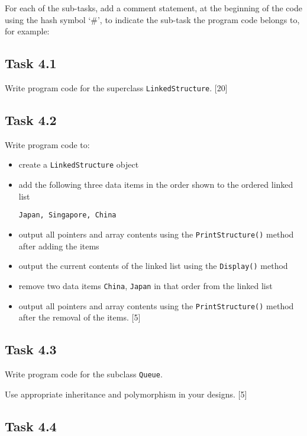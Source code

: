 For each of the sub-tasks, add a comment statement, at the beginning
of the code using the hash symbol \textquoteleft \#\textquoteright ,
to indicate the sub-task the program code belongs to, for example:

\subsection*{Task 4.1 }

Write program code for the superclass \texttt{LinkedStructure}. \hfill{}{[}20{]}

\subsection*{Task 4.2}

Write program code to:
\begin{itemize}
\item create a \texttt{LinkedStructure} object 
\item add the following three data items in the order shown to the ordered
linked list 
\noindent \begin{center}
\texttt{Japan, Singapore, China }
\par\end{center}
\item output all pointers and array contents using the \texttt{PrintStructure()}
method after adding the items 
\item output the current contents of the linked list using the \texttt{Display()}
method 
\item remove two data items \texttt{China}, \texttt{Japan} in that order
from the linked list 
\item output all pointers and array contents using the \texttt{PrintStructure()}
method after the removal of the items. \hfill{} {[}5{]}
\end{itemize}

\subsection*{Task 4.3}

Write program code for the subclass \texttt{Queue}.

Use appropriate inheritance and polymorphism in your designs. \hfill{}{[}5{]}

\subsection*{Task 4.4}

